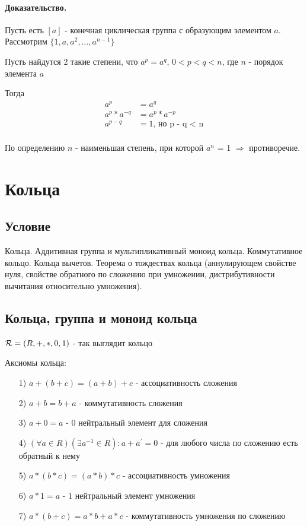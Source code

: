 \documentclass{report}
\begin{document}
\paragraph*{Доказательство.}
Пусть есть $[a]$ - конечная циклическая группа с образующим элементом $a$.
Рассмотрим $\{1,a,a^{2},\ldots, a^{n-1}\}$

Пусть найдутся 2 такие степени, что $a^{p} = a^{q}$, $0 < p < q < n$, где $n$ - порядок элемента $a$

Тогда
\begin{align*}
	a^{p}          & = a^{q}                   \\
	a^{p} * a^{-q} & = a^{p} * a^{-p}          \\
	a^{p-q}        & = 1 \mbox{, но p - q < n} \\
\end{align*}

По определению $n$ - наименьшая степень, при которой $a^{n}$ = 1 $\Rightarrow$ противоречие.

\newpage

\section{Кольца}
\subsection{Условие}
Кольца. Аддитивная группа и мультипликативный моноид кольца. Коммутативное
кольцо. Кольца вычетов. Теорема о тождествах кольца (аннулирующем свойстве нуля,
свойстве обратного по сложению при умножении, дистрибутивности вычитания
относительно умножения).

\subsection{Кольца, группа и моноид кольца}
${\cal R} = (R, +, *, 0, 1)$ - так выглядит кольцо

\medskip

Аксиомы кольца:
\begin{itemize}
	\item[1)] $a + (b + c) = (a + b) + c$ - ассоциативность сложения
	\item[2)] $a + b = b + a$ - коммутативность сложения
	\item[3)] $a + 0 = a$ - $0$ нейтральный элемент для сложения
	\item[4)] $(\forall a \in R)(\exists a^{-1} \in R): a + a^{\prime} = 0$ - для любого числа по сложению есть обратный к нему
	\item[5)] $a * (b * c) = (a * b) * c$ - ассоциативность умножения
	\item[6)] $a * 1 = a$ - $1$ нейтральный элемент умножения
	\item[7)] $a*(b+c) = a*b + a*c$ - коммутативность умножения по сложению
\end{itemize}
\end{document}
